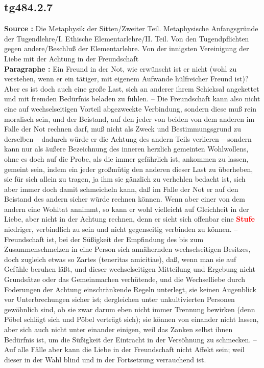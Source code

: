 \documentclass[a4paper,12pt,twoside]{book}
\newcommand{\match}[1]{\textcolor{red}{\textbf{#1}}}
\begin{document}
	\subsection*{tg484.2.7} 
	\textbf{Source : }Die Metaphysik der Sitten/Zweiter Teil. Metaphysische Anfangsgründe der Tugendlehre/I. Ethische Elementarlehre/II. Teil. Von den Tugendpflichten gegen andere/Beschluß der Elementarlehre. Von der innigsten Vereinigung der Liebe mit der Achtung in der Freundschaft\\  
	
	\textbf{Paragraphe : }Ein Freund in der Not, wie erwünscht ist er nicht (wohl zu verstehen, wenn er ein tätiger, mit eigenem Aufwande hülfreicher Freund ist)? Aber es ist doch auch eine große Last, sich an anderer ihrem Schicksal angekettet und mit fremden Bedürfnis beladen zu fühlen. – Die Freundschaft kann also nicht eine auf wechselseitigen Vorteil abgezweckte Verbindung, sondern diese muß rein moralisch sein, und der Beistand, auf den jeder von beiden von dem anderen im Falle der Not rechnen darf, muß nicht als Zweck und Bestimmungsgrund zu derselben – dadurch würde er die Achtung des andern Teils verlieren – sondern kann nur als äußere Bezeichnung des inneren herzlich gemeinten Wohlwollens, ohne es doch auf die Probe, als die immer gefährlich ist, ankommen zu lassen, gemeint sein, indem ein jeder großmütig den anderen dieser Last zu überheben, sie für sich allein zu tragen, ja ihm sie gänzlich zu verhehlen bedacht ist, sich aber immer doch damit schmeicheln kann, daß im Falle der Not er auf den Beistand des andern sicher würde rechnen können. Wenn aber einer von dem andern eine Wohltat annimmt, so kann er wohl vielleicht auf Gleichheit in der Liebe, aber nicht in der Achtung rechnen, denn er sieht sich offenbar eine \match{Stufe} niedriger, verbindlich zu sein und nicht gegenseitig verbinden zu können. – Freundschaft ist, bei der Süßigkeit der Empfindung des bis zum Zusammenschmelzen in eine Person sich annähernden wechselseitigen Besitzes, doch zugleich etwas so Zartes (teneritas amicitiae), daß, wenn man sie auf Gefühle beruhen läßt, und dieser wechselseitigen Mitteilung und Ergebung nicht Grundsätze oder das Gemeinmachen verhütende, und die Wechselliebe durch Foderungen der Achtung einschränkende  Regeln unterlegt, sie keinen Augenblick vor Unterbrechungen sicher ist; dergleichen unter unkultivierten Personen gewöhnlich sind, ob sie zwar darum eben nicht immer Trennung bewirken (denn Pöbel schlägt sich und Pöbel verträgt sich); sie können von einander nicht lassen, aber sich auch nicht unter einander einigen, weil das Zanken selbst ihnen Bedürfnis ist, um die Süßigkeit der Eintracht in der Versöhnung zu schmecken. – Auf alle Fälle aber kann die Liebe in der Freundschaft nicht Affekt sein; weil dieser in der Wahl blind und in der Fortsetzung verrauchend ist. 
	
\end{document}

